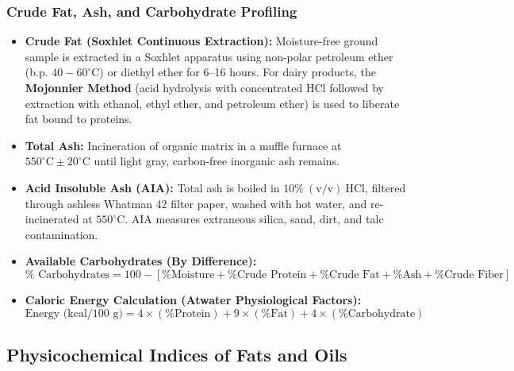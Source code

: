 \documentclass[11pt,a4paper,oneside]{article}
\begin{document}
\subsubsection{Crude Fat, Ash, and Carbohydrate Profiling}
\begin{itemize}[leftmargin=*]
    \item \textbf{Crude Fat (Soxhlet Continuous Extraction):} Moisture-free ground sample is extracted in a Soxhlet apparatus using non-polar petroleum ether (b.p. $40-60^\circ\text{C}$) or diethyl ether for 6--16 hours. For dairy products, the \textbf{Mojonnier Method} (acid hydrolysis with concentrated $\mathrm{HCl}$ followed by extraction with ethanol, ethyl ether, and petroleum ether) is used to liberate fat bound to proteins.
    \item \textbf{Total Ash:} Incineration of organic matrix in a muffle furnace at \textbf{$550^\circ\text{C} \pm 20^\circ\text{C}$} until light gray, carbon-free inorganic ash remains.
    \item \textbf{Acid Insoluble Ash (AIA):} Total ash is boiled in $10\%\ (\text{v/v})\ \mathrm{HCl}$, filtered through ashless Whatman 42 filter paper, washed with hot water, and re-incinerated at $550^\circ\text{C}$. AIA measures extraneous silica, sand, dirt, and talc contamination.
    \item \textbf{Available Carbohydrates (By Difference):}
    $$\% \text{ Carbohydrates} = 100 - [\% \text{Moisture} + \% \text{Crude Protein} + \% \text{Crude Fat} + \% \text{Ash} + \% \text{Crude Fiber}]$$
    \item \textbf{Caloric Energy Calculation (Atwater Physiological Factors):}
    $$\text{Energy (kcal/100 g)} = 4 \times (\% \text{Protein}) + 9 \times (\% \text{Fat}) + 4 \times (\% \text{Carbohydrate})$$
\end{itemize}

\subsection{Physicochemical Indices of Fats and Oils}
\end{document}
